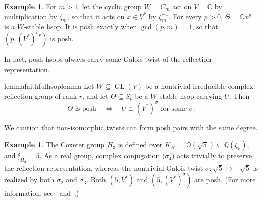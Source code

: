 \documentclass[10pt,a4paper]{amsart}
\theoremstyle{definition}
\newtheorem{example}[theorem]{Example}
\newcommand{\C}{\mathbb C}\newcommand{\Q}{\mathbb Q}
\begin{document}
\begin{example}\label{ex:intro-cyclic}
For $m>1$, let the cyclic group $W=C_m$ act on $V=\C$ by multiplication by
$\zeta_m$, so that it acts on $x\in V^*$ by $\zeta_m^{-1}$.
For every $p>0$, $\Theta=\C x^p$ is a $W$-stable hsop.
It is posh exactly when $\gcd(p,m)=1$, so that $(p,(V^*)^{\sigma_p})$ is posh.
\end{example}

In fact, posh hsops always carry some Galois twist of the reflection representation.
\begin{restatable}{lemma}{faithfulhsoplemma}\label{a:cor:faithful-hsop}
Let $W\subseteq\operatorname{GL}(V)$ be a nontrivial irreducible complex reflection
group of rank $r$, and let $\Theta\subseteq S_p$ be a $W$-stable hsop
carrying $U$. Then
\[
 \Theta\text{ is posh}
 \quad\Longleftrightarrow\quad
 U\cong(V^*)^\sigma\text{ for some }\sigma.
\]
\end{restatable}


We caution that non-isomorphic twists can form posh pairs with the same degree.

\begin{example}\label{ex:intro-h3}
The Coxeter group $H_3$ is defined over $K_{H_3}=\mathbb{Q}(\sqrt{5})\subseteq\mathbb{Q}(\zeta_5)$, and
$\mathfrak f_{H_3}=5$.  As a real group, complex conjugation ($\sigma_4$) acts trivially to preserve the reflection representation, whereas the nontrivial Galois twist $\sigma: \sqrt{5}\mapsto-\sqrt{5}$ is realized by both $\sigma_2$ and $\sigma_3$. Both $(5,V^*)$ and $(5,(V^*)^\sigma)$ are posh. (For more information, see~\cite{BalagovicPuranik} and~.)
\end{example}
\end{document}
